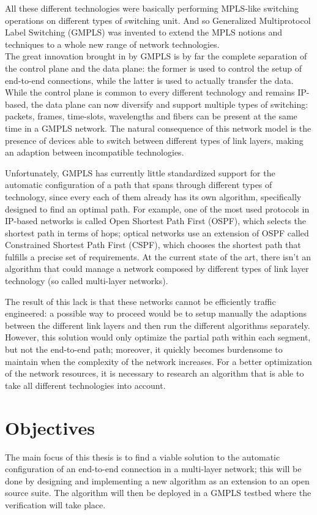 \documentclass[10pt,a4paper]{report}
\begin{document}
All these different technologies were basically performing MPLS-like
switching operations on different types of switching unit. And so
Generalized Multiprotocol Label Switching (GMPLS) was invented to
extend the MPLS notions and techniques to a whole new range of network
technologies. \\
The great innovation brought in by GMPLS is by far the complete
separation of the control plane and the data plane: the former is used
to control the setup of end-to-end connections, while the latter is
used to actually transfer the data. While the control plane is common
to every different technology and remains IP-based, the data plane can
now diversify and support multiple types of switching: packets,
frames, time-slots, wavelengths and fibers can be present at the same
time in a GMPLS network. The natural consequence of this network model
is the presence of devices able to switch between different types of
link layers, making an adaption between incompatible technologies.

Unfortunately, GMPLS has currently little standardized support for the
automatic configuration of a path that spans through different types
of technology, since every each of them already has its own algorithm,
specifically designed to find an optimal path. For example, one of the
most used protocols in IP-based networks is called Open Shortest Path
First (OSPF), which selects the shortest path in terms of hops; optical
networks use an extension of OSPF called Constrained Shortest Path
First (CSPF), which chooses the shortest path that fulfills a precise
set of requirements. At the current state of the art, there isn't an
algorithm that could manage a network composed by different types of
link layer technology (so called multi-layer networks).

The result of this lack is that these networks cannot be efficiently
traffic engineered: a possible way to proceed would be to setup
manually the adaptions between the different link layers and then run
the different algorithms separately. However, this solution would only
optimize the partial path within each segment, but not the end-to-end
path; moreover, it quickly becomes burdensome to maintain when the
complexity of the network increases. For a better optimization of the
network resources, it is necessary to research an algorithm that is
able to take all different technologies into account.

\newpage

\section{Objectives}
The main focus of this thesis is to find a viable solution to the
automatic configuration of an end-to-end connection in a multi-layer
network; this will be done by designing and implementing a new
algorithm as an extension to an open source suite. The algorithm will
then be deployed in a GMPLS testbed where the verification will take
place.
\end{document}
